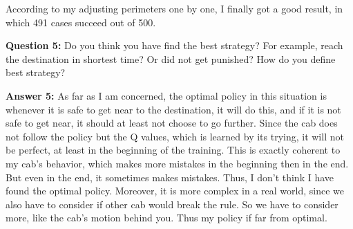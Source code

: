 \documentclass[11pt,a4paper]{article}
\begin{document}
\vspace{3mm}
\noindent According to my adjusting perimeters one by one, I finally got a good result, in which 491 cases succeed out of 500.

\vspace{3mm}
\noindent \textbf{Question 5:} Do you think you have find the best strategy? For example, reach the destination in shortest time? Or did not get punished? How do you define best strategy?

\vspace{3mm}
\noindent \textbf{Answer 5:} As far as I am concerned, the optimal policy in this situation is whenever it is safe to get near to the destination, it will do this, and if it is not safe to get near, it should at least not choose to go further. Since the cab does not follow the policy but the Q values, which is learned by its trying, it will not be perfect, at least in the beginning of the training. This is exactly coherent to my cab's behavior, which makes more mistakes in the beginning then in the end. But even in the end, it sometimes makes mistakes. Thus, I don't think I have found the optimal policy. Moreover, it is more complex in a real world, since we also have to consider if other cab would break the rule. So we have to consider more, like the cab's motion behind you. Thus my policy if far from optimal.
\end{document}
